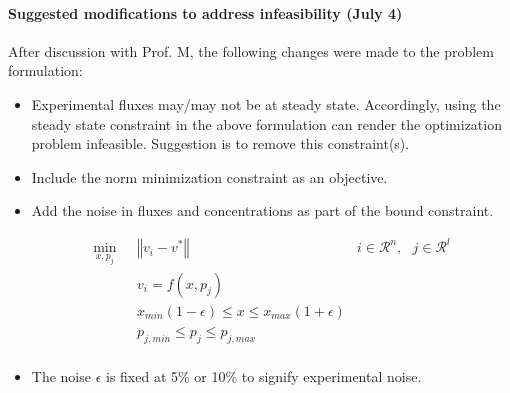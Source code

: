 \documentclass[10pt]{report}
\begin{document}
	\paragraph{Suggested modifications to address infeasibility (July 4)}
	After discussion with Prof. M, the following changes were made to the problem formulation:
	\begin{itemize}
		\item Experimental fluxes may/may not be at steady state. Accordingly, using the steady state constraint in the above formulation can render the optimization problem infeasible. Suggestion is to remove this constraint(s).
		\item Include the norm minimization constraint as an objective.
		\item Add the noise in fluxes and concentrations as part of the bound constraint.
		\begin{center}
			\begin{subequations}
				\begin{align}
				\underset{x,p_j}{\mathrm{min}} & \text{      }\left\Vert v_i-v^*\right\Vert &  i\in\mathcal{R}^n,\text{  }j\in\mathcal{R}^l\\
				& \text{      }v_i = f(x,p_j)\\
				& \text{      }x_{min}(1-\epsilon)\le x \le x_{max}(1+\epsilon)\\
				& \text{      }p_{j,min} \le p_j \le p_{j,max}\\
				\end{align}
			\end{subequations}
		\end{center}
	\item The noise $\epsilon$ is fixed at 5\% or 10\% to signify experimental noise.
	\end{itemize}
	
\end{document}
